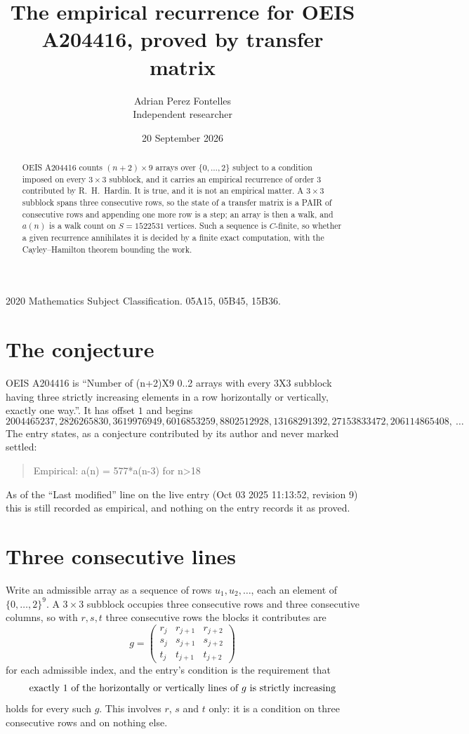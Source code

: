 \documentclass[11pt,a4paper]{article}
\title{The empirical recurrence for OEIS A204416, proved by transfer matrix}
\author{Adrian Perez Fontelles\\ \small Independent researcher}
\date{20 September 2026}
\theoremstyle{plain}
\theoremstyle{definition}
\begin{document}
\maketitle

\begin{abstract}
OEIS A204416 counts $(n+2)\times9$ arrays over $\{0,\dots,2\}$ subject to a condition imposed on
every $3\times3$ subblock, and it carries an empirical recurrence of order $3$
contributed by R.~H.~Hardin. It is true, and it is not an empirical matter. A $3\times3$
subblock spans three consecutive rows, so the state of a transfer matrix is a PAIR of
consecutive rows and appending one more row is a step; an array is then a walk, and
$a(n)$ is a walk count on $S=1522531$ vertices. Such a sequence is $C$-finite, so whether a given
recurrence annihilates it is decided by a finite exact computation, with the Cayley--Hamilton
theorem bounding the work.
\end{abstract}

\noindent\small 2020 Mathematics Subject Classification. 05A15, 05B45, 15B36.\normalsize

\section{The conjecture}

OEIS A204416 is ``Number of (n+2)X9 0..2 arrays with every 3X3 subblock having three strictly increasing elements in a row horizontally or vertically, exactly one way.''. It has offset $1$ and begins
\[
2004465237, 2826265830, 3619976949, 6016853259, 8802512928, 13168291392, 27153833472, 206114865408,\ \dots
\]
The entry states, as a conjecture contributed by its author and never marked settled:
\begin{quote}
Empirical: a(n) = 577*a(n-3) for n>18
\end{quote}
As of the ``Last modified'' line on the live entry (Oct 03 2025 11:13:52, revision 9) this is still
recorded as empirical, and nothing on the entry records it as proved.

\section{Three consecutive lines}

Write an admissible array as a sequence of rows $u_1,u_2,\dots$, each an element of
$\{0,\dots,2\}^{9}$. A $3\times3$ subblock occupies three consecutive rows and
three consecutive columns, so with $r,s,t$ three consecutive rows the blocks it
contributes are
\[
g=\begin{pmatrix}r_j&r_{j+1}&r_{j+2}\\ s_j&s_{j+1}&s_{j+2}\\ t_j&t_{j+1}&t_{j+2}\end{pmatrix}
\]
for each admissible index, and the entry's condition is the requirement that
\[
\text{exactly }1\text{ of the horizontally or vertically lines of }g\text{ \text{is strictly increasing}}
\]
holds for every such $g$. This involves $r$, $s$ and $t$ only: it is a condition on
three consecutive rows and on nothing else.
\end{document}
